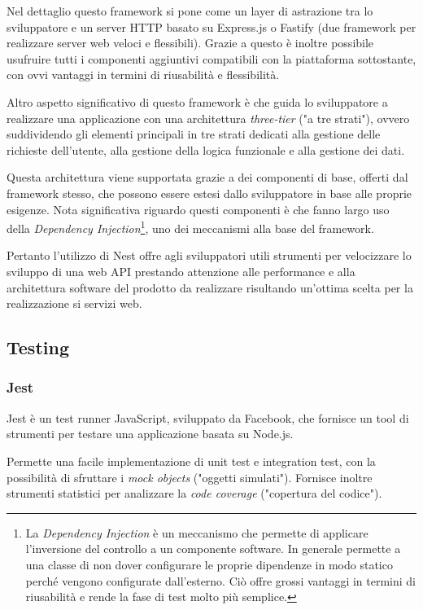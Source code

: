 Nel dettaglio questo framework si pone come un layer di astrazione tra lo sviluppatore e un server HTTP basato su Express.js o Fastify (due framework per realizzare
server web veloci e flessibili). Grazie a questo è inoltre possibile usufruire tutti i componenti aggiuntivi compatibili con la piattaforma sottostante, con ovvi
vantaggi in termini di riusabilità e flessibilità.

Altro aspetto significativo di questo framework è che guida lo sviluppatore a realizzare una applicazione con una architettura \textit{three-tier} ("a tre strati"),
ovvero suddividendo gli elementi principali in tre strati dedicati alla gestione delle richieste dell'utente, alla gestione della logica funzionale e alla gestione dei dati.


Questa architettura viene supportata grazie a dei componenti di base, offerti dal framework stesso, che possono
essere estesi dallo sviluppatore in base alle proprie esigenze.
Nota significativa riguardo questi componenti è che fanno largo uso della
\textit{Dependency Injection}\footnote{
    La \textit{Dependency Injection} è un meccanismo che permette di applicare
    l'inversione del controllo a un componente software. In generale permette a una classe di non dover configurare
    le proprie dipendenze in modo statico perché vengono configurate dall'esterno. Ciò offre grossi vantaggi in termini di riusabilità e rende la fase di test molto più semplice.},
uno dei meccanismi alla base del framework.

Pertanto l'utilizzo di Nest offre agli sviluppatori utili strumenti per velocizzare lo sviluppo di una web API prestando attenzione
alle performance e alla architettura software del prodotto da realizzare risultando un'ottima scelta per la realizzazione si servizi web.

\subsection{Testing}
\subsubsection{Jest}
Jest\cite{Jest} è un test runner JavaScript, sviluppato da Facebook, che fornisce un tool di strumenti per testare una applicazione basata su Node.js.

Permette una facile implementazione di unit test e integration test, con la possibilità di
sfruttare i \textit{mock objects} ("oggetti simulati"). Fornisce inoltre strumenti statistici per analizzare
la \textit{code coverage} ("copertura del codice").


